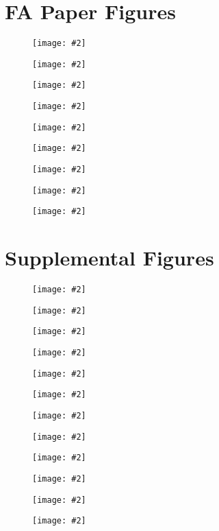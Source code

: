 \documentclass[letterpaper,12pt]{article}
\newcommand{\insertfigure}[2][1.0]{
	\begin{center}
	\begin{figure}[htbp]
	\texttt{[image: \#2]}
	\caption{}
	\end{figure}
	\end{center}
}
\begin{document}
\section*{FA Paper Figures}

\insertfigure[0.9]{../../figures/FA_workflow/graphic_workflow.png}
\insertfigure{../../figures/statics/statics}
\insertfigure[0.8]{../../figures/kinetics/kinetics}
\insertfigure{../../figures/spatial/spatial}
\insertfigure{../../figures/FAK/FAK_vs_Paxillin_dynamics}
\insertfigure{../../figures/S178A/statics_comparisons}
\insertfigure{../../figures/S178A/S178A_vs_wild-type}
\insertfigure{../../figures/lifetimes/adhesion_phase_lifetimes_alt}
\insertfigure{../../figures/S178A/sample_timecourse_no_legend}

\FloatBarrier
\section*{Supplemental Figures}
\renewcommand{\figurename}{Figure S}
\setcounter{figure}{0}

\insertfigure{../../figures/supplemental/R_squared}
\insertfigure{../../figures/FAK/FAK_vs_Paxillin_statics}
\insertfigure[0.8]{../../figures/supplemental/tracking_flowchart}
\insertfigure[0.8]{../../figures/parameter_variation/comparison_assembly}
\insertfigure[0.8]{../../figures/parameter_variation/comparison_disassembly}
\insertfigure{../../figures/controls/assembly_length_variation}
\insertfigure{../../figures/controls/disassembly_length_variation}
\insertfigure{../../figures/parameter_variation/resampled_wt_slopes}
\insertfigure{../../figures/parameter_variation/resampled_S178A_slopes}
\insertfigure{../../figures/simulation/stationary_results}
\insertfigure[0.8]{../../figures/simulation/moving_results}
\insertfigure{../../figures/simulation/kinetics_results}
\end{document}

